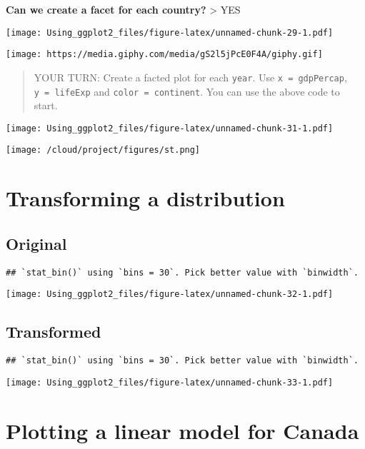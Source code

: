 \documentclass[]{article}
\begin{document}
\textbf{Can we create a facet for each country?} \textgreater{} YES

\texttt{[image: Using\_ggplot2\_files/figure-latex/unnamed-chunk-29-1.pdf]}

\texttt{[image: https://media.giphy.com/media/gS2l5jPcE0F4A/giphy.gif]}

\begin{quote}
YOUR TURN: Create a facted plot for each \texttt{year}. Use
\texttt{x\ =\ gdpPercap}, \texttt{y\ =\ lifeExp} and
\texttt{color\ =\ continent}. You can use the above code to start.
\end{quote}

\texttt{[image: Using\_ggplot2\_files/figure-latex/unnamed-chunk-31-1.pdf]}

\texttt{[image: /cloud/project/figures/st.png]}

\hypertarget{transforming-a-distribution}{%
\section{Transforming a
distribution}\label{transforming-a-distribution}}

\hypertarget{original}{%
\subsection{Original}\label{original}}

\begin{verbatim}
## `stat_bin()` using `bins = 30`. Pick better value with `binwidth`.
\end{verbatim}

\texttt{[image: Using\_ggplot2\_files/figure-latex/unnamed-chunk-32-1.pdf]}

\hypertarget{transformed}{%
\subsection{Transformed}\label{transformed}}

\begin{verbatim}
## `stat_bin()` using `bins = 30`. Pick better value with `binwidth`.
\end{verbatim}

\texttt{[image: Using\_ggplot2\_files/figure-latex/unnamed-chunk-33-1.pdf]}

\hypertarget{plotting-a-linear-model-for-canada}{%
\section{Plotting a linear model for
Canada}\label{plotting-a-linear-model-for-canada}}
\end{document}
